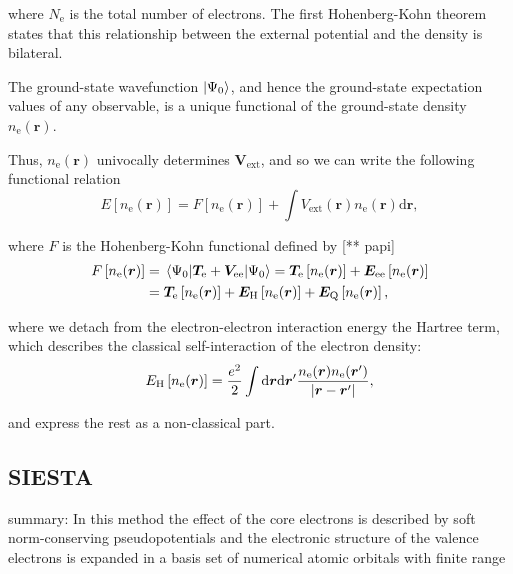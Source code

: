 where \(N_{\mathrm{e}}\) is the total number of electrons. The first Hohenberg-Kohn theorem states that this relationship between the external potential and the density is bilateral.

\begin{theorem}
The ground-state wavefunction \(\ket{\Psi_0}\), and hence the ground-state expectation values of any observable, is a unique functional of the ground-state density \(n_{\mathrm e}(\bm{r})\).
\end{theorem}

Thus, \(n_{\mathrm e}(\bm r)\) univocally determines \(\bm V_{\mathrm{ext}}\), and so we can write the following functional relation
\begin{equation}
	E\left[n_{\mathrm{e}}(\bm{r})\right]=F\left[n_{\mathrm{e}}(\bm{r})\right]+\int V_{\mathrm{ext}}(\bm{r}) n_{\mathrm{e}}(\bm{r}) \mathrm{d} \bm{r},
\end{equation}

where \(F\) is the Hohenberg-Kohn functional defined by [** papi]
\begin{equation}
\begin{split}
F\left[n_{\mathrm{e}}(\bm{r})\right]&=\expval{\bm T_{\mathrm e}+\bm V_{\mathrm{ee}}}{\Psi_0}=\bm T_{\mathrm e}\left[n_{\mathrm{e}}(\bm{r})\right]+\bm E_{\mathrm{ee}}\left[n_{\mathrm{e}}(\bm{r})\right]\\
&=\bm T_{\mathrm e}\left[n_{\mathrm{e}}(\bm{r})\right]+\bm E_{\mathrm{H}}\left[n_{\mathrm{e}}(\bm{r})\right]+\bm E_{\mathrm{Q}}\left[n_{\mathrm{e}}(\bm{r})\right],
\end{split}
\end{equation}

where we detach from the electron-electron interaction energy the Hartree term, which describes the classical self-interaction of the electron density:
\begin{equation}
E_{\mathrm{H}}\left[n_{\mathrm{e}}(\bm{r})\right]=\frac {e^2} 2 \int\mathrm{d}\bm r\mathrm{d}\bm{r}'\frac{n_{\mathrm{e}}(\bm{r})n_{\mathrm{e}}(\bm{r}')}{\abs{\bm{r} - \bm{r}'}},
\end{equation}

and express the rest as a non-classical part. %

\subsection{SIESTA}
summary: In this method the effect of
the core electrons is described by soft norm-conserving
pseudopotentials and the electronic structure of the valence
electrons is expanded in a basis set of numerical atomic orbitals with finite range

